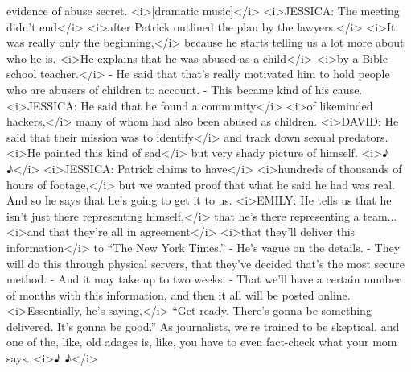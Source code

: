 \begin{itemize}
  evidence of abuse secret. \textless{}i\textgreater{}{[}dramatic
  music{]}\textless{}/i\textgreater{} \textless{}i\textgreater{}JESSICA:
  The meeting didn't end\textless{}/i\textgreater{}
  \textless{}i\textgreater{}after Patrick outlined the plan by the
  lawyers.\textless{}/i\textgreater{} \textless{}i\textgreater{}It was
  really only the beginning,\textless{}/i\textgreater{} because he
  starts telling us a lot more about who he is.
  \textless{}i\textgreater{}He explains that he was abused as a
  child\textless{}/i\textgreater{} \textless{}i\textgreater{}by a
  Bible-school teacher.\textless{}/i\textgreater{} - He said that that's
  really motivated him to hold people who are abusers of children to
  account. - This became kind of his cause.
  \textless{}i\textgreater{}JESSICA: He said that he found a
  community\textless{}/i\textgreater{} \textless{}i\textgreater{}of
  likeminded hackers,\textless{}/i\textgreater{} many of whom had also
  been abused as children. \textless{}i\textgreater{}DAVID: He said that
  their mission was to identify\textless{}/i\textgreater{} and track
  down sexual predators. \textless{}i\textgreater{}He painted this kind
  of sad\textless{}/i\textgreater{} but very shady picture of himself.
  \textless{}i\textgreater{}♪ ♪\textless{}/i\textgreater{}
  \textless{}i\textgreater{}JESSICA: Patrick claims to
  have\textless{}/i\textgreater{} \textless{}i\textgreater{}hundreds of
  thousands of hours of footage,\textless{}/i\textgreater{} but we
  wanted proof that what he said he had was real. And so he says that
  he's going to get it to us. \textless{}i\textgreater{}EMILY: He tells
  us that he isn't just there representing
  himself,\textless{}/i\textgreater{} that he's there representing a
  team... \textless{}i\textgreater{}and that they're all in
  agreement\textless{}/i\textgreater{} \textless{}i\textgreater{}that
  they'll deliver this information\textless{}/i\textgreater{} to ``The
  New York Times.'' - He's vague on the details. - They will do this
  through physical servers, that they've decided that's the most secure
  method. - And it may take up to two weeks. - That we'll have a certain
  number of months with this information, and then it all will be posted
  online. \textless{}i\textgreater{}Essentially, he's
  saying,\textless{}/i\textgreater{} ``Get ready. There's gonna be
  something delivered. It's gonna be good.'' As journalists, we're
  trained to be skeptical, and one of the, like, old adages is, like,
  you have to even fact-check what your mom says.
  \textless{}i\textgreater{}♪ ♪\textless{}/i\textgreater{}

\end{itemize}
